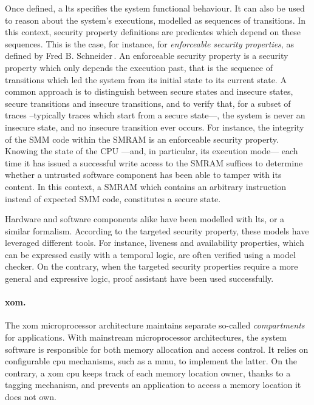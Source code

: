Once defined, a \ac{lts} specifies the system functional behaviour.
%
It can also be used to reason about the system's executions, modelled as
sequences of transitions.
%
In this context, security property definitions are predicates which depend on
these sequences.
%
This is the case, for instance, for \emph{enforceable security properties}, as
defined by Fred B. Schneider\,\cite{schneider2000enforceable}.
%
An enforceable security property is a security property which only depends the
execution past, that is the sequence of transitions which led the system from
its initial state to its current state.
%
A common approach is to distinguish between secure states and insecure states,
secure transitions and insecure transitions, and to verify that, for a subset of
traces --typically traces which start from a secure state---, the system is
never an insecure state, and no insecure transition ever occurs.
%
For instance, the integrity of the SMM code within the SMRAM is an enforceable
security property.
%
Knowing the state of the CPU ---and, in particular, its execution mode--- each
time it has issued a successful write access to the SMRAM suffices to determine
whether a untrusted software component has been able to tamper with its content.
%
In this context, a SMRAM which contains an arbitrary instruction instead of
expected SMM code, constitutes a secure state.

Hardware and software components alike have been modelled with \ac{lts}, or a
similar formalism.
%
According to the targeted security property, these models have leveraged
different tools.
%
For instance, liveness and availability properties, which can be expressed
easily with a temporal logic, are often verified using a model checker.
%
On the contrary, when the targeted security properties require a more general
and expressive logic, proof assistant have been used successfully.

\paragraph{\ac{xom}.}
%
The \ac{xom} microprocessor architecture maintains separate so-called
\emph{compartments} for applications.
%
With mainstream microprocessor architectures, the system software is responsible
for both memory allocation and access control.
%
It relies on configurable \ac{cpu} mechanisms, such as a \ac{mmu}, to implement
the latter.
%
On the contrary, a \ac{xom} \ac{cpu} keeps track of each memory location owner,
thanks to a tagging mechanism, and prevents an application to access a memory
location it does not own.

